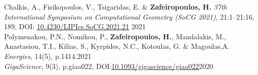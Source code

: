 \documentclass[
	a4paper,
]{fortysecondscv}
\begin{document}
\begin{cvtable}
	{Chalkis, A., Fisikopoulos, V., Tsigaridas, E. \& \textbf{Zafeiropoulos, H.}}
	{\textit{37th International Symposium on Computational Geometry (SoCG 2021)}, 21:1--21:16, 189, DOI: \href{https://doi.org/10.4230/LIPIcs.SoCG.2021.21}{10.4230/LIPIcs.SoCG.2021.21}}
	{2021} \\

	{Polymenakou, P.N., Nomikou, P., \textbf{Zafeiropoulos, H.}, Mandalakis, M., Anastasiou, T.I., Kilias, S., Kyrpides, N.C., Kotoulas, G. \& Magoulas,A.}
	{\textit{Energies}, 14(5), p.1414.}{2021} \\

	{\textit{GigaScience}, 9(3), p.giaa022, DOI:\href{https://doi.org/10.1093/gigascience/giaa022}{10.1093/gigascience/giaa022}}{2020}
	
\end{cvtable}




\newpage
\makemoresidebar

\end{document}
